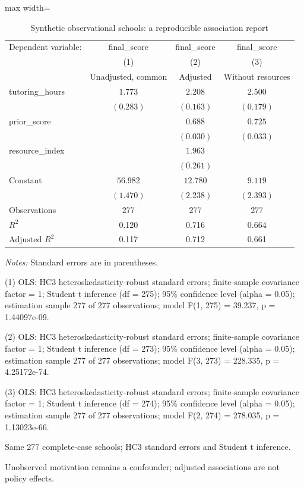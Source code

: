 \begin{table}[htbp]
\centering
\caption{Synthetic observational schools: a reproducible association report}
\begingroup
\small
\setlength{\tabcolsep}{6pt}
\renewcommand{\arraystretch}{1.12}
\begin{adjustbox}{max width=\linewidth}
\begin{tabular}{@{}lccc@{}}
\toprule
Dependent variable: & final\_score & final\_score & final\_score \\
 & (1) & (2) & (3) \\
 & Unadjusted, common & Adjusted & Without resources \\
\midrule
tutoring\_hours & $1.773$ & $2.208$ & $2.500$ \\
 & $(0.283)$ & $(0.163)$ & $(0.179)$ \\[0.35em]
prior\_score &  & $0.688$ & $0.725$ \\
 &  & $(0.030)$ & $(0.033)$ \\[0.35em]
resource\_index &  & $1.963$ &  \\
 &  & $(0.261)$ &  \\[0.35em]
Constant & $56.982$ & $12.780$ & $9.119$ \\
 & $(1.470)$ & $(2.238)$ & $(2.393)$ \\[0.35em]
\midrule
Observations & 277 & 277 & 277 \\
$R^{2}$ & 0.120 & 0.716 & 0.664 \\
$\text{Adjusted }R^{2}$ & 0.117 & 0.712 & 0.661 \\
\bottomrule
\end{tabular}
\end{adjustbox}
\par\smallskip
\begin{minipage}{\linewidth}
\footnotesize
\raggedright
\textit{Notes:} Standard errors are in parentheses.\par
(1) OLS: HC3 heteroskedasticity-robust standard errors; finite-sample covariance factor = 1; Student t inference (df = 275); 95\% confidence level (alpha = 0.05); estimation sample 277 of 277 observations; model F(1, 275) = 39.237, p = 1.44097e-09.\par
(2) OLS: HC3 heteroskedasticity-robust standard errors; finite-sample covariance factor = 1; Student t inference (df = 273); 95\% confidence level (alpha = 0.05); estimation sample 277 of 277 observations; model F(3, 273) = 228.335, p = 4.25172e-74.\par
(3) OLS: HC3 heteroskedasticity-robust standard errors; finite-sample covariance factor = 1; Student t inference (df = 274); 95\% confidence level (alpha = 0.05); estimation sample 277 of 277 observations; model F(2, 274) = 278.035, p = 1.13023e-66.\par
Same 277 complete-case schools; HC3 standard errors and Student t inference.\par
Unobserved motivation remains a confounder; adjusted associations are not policy effects.\par
\end{minipage}
\endgroup
\end{table}
